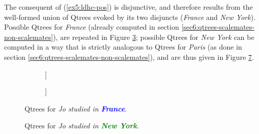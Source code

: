 The consequent of (\ref{ex5:ldhc-pos}) is disjunctive, and therefore results from the well-formed union of Qtrees evoked by its two disjuncts (\textit{France} and \textit{New York}). Possible Qtrees for \textit{France} (already computed in section \ref{sec6:qtrees-scalemates-non-scalemates}), are repeated in Figure \ref{trees:france-2}; possible Qtrees for \textit{New York} can be computed in a way that is strictly analogous to Qtrees for \textit{Paris} (as done in section \ref{sec6:qtrees-scalemates-non-scalemates}), and are thus given in Figure \ref{trees:new-york}.
\begin{figure}[H]
	\centering
	\begin{subfigure}[b]{.3\linewidth}
		\centering
		\begin{forest}
			[CS[\bfbox{France}][$\neg$France]]
		\end{forest}
		\caption{}\label{tree:france-polar-2}
	\end{subfigure}
	\qquad
	\begin{subfigure}[b]{.3\linewidth}
		\centering
		\begin{forest}
			[CS[\bfbox{France}][US][...]]
		\end{forest}
		\caption{}\label{tree:france-wh-2}
	\end{subfigure}
	\caption{Qtrees for \textit{Jo studied in \textbf{\textcolor{blue}{France}}}.} \label{trees:france-2}
\end{figure}

\begin{figure}[H]
	\centering
	\begin{subfigure}[b]{.3\linewidth}
		\centering
		\caption{}\label{tree:new-york-polar}
	\end{subfigure}
	\hfill
	\begin{subfigure}[b]{.3\linewidth}
		\centering
		\caption{}\label{tree:new-york-wh}
	\end{subfigure}\hfill
	\begin{subfigure}[b]{.3\linewidth}
		\centering
		\caption{}\label{tree:new-york-tiered}
	\end{subfigure}
	
	
	\caption{Qtrees for \textit{Jo studied in \textbf{\textcolor{green}{New York}}.}}\label{trees:new-york}
\end{figure}

